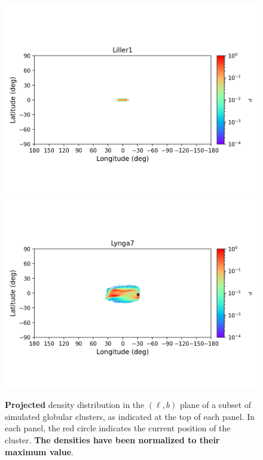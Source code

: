 \begin{figure}
        \includegraphics[clip=true, trim = 0mm 20mm 0mm 10mm, width=1\columnwidth]{images/error_plots_Liller1.png}
        \includegraphics[clip=true, trim = 0mm 20mm 0mm 10mm, width=1\columnwidth]{images/error_plots_Lynga7.png}
        \caption[]{\textbf{Projected} density distribution in the $(\ell, b)$ plane of a subset of simulated globular clusters, as indicated at the top of each panel. In each panel, the red circle indicates the current position of the cluster. \textbf{The densities have been normalized to their maximum value}.}\label{stream3}
        \end{figure}
